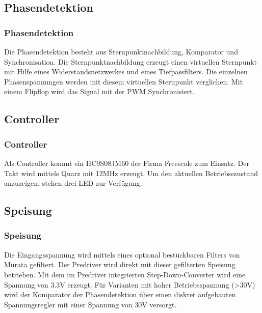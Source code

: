 \ifSTANDALONE
\subsection{Phasendetektion}
\fi
\ifEMBED
\subsubsection{Phasendetektion}
\fi
Die Phasendetektion besteht aus Sternpunktnachbildung, Komparator und 
Synchronisation. Die Sternpunktnachbildung erzeugt einen virtuellen Sternpunkt 
mit Hilfe eines Widerstandsnetzwerkes und eines Tiefpassfilters. Die einzelnen 
Phasenspannungen werden mit diesem virtuellen Sternpunkt verglichen. Mit einem 
Flipflop wird das Signal mit der PWM Synchronisiert. 

\ifSTANDALONE
\subsection{Controller}
\fi
\ifEMBED
\subsubsection{Controller}
\fi
Als Controller kommt ein HC9S08JM60 der Firma Freescale zum Einsatz. Der Takt 
wird mittels Quarz mit 12MHz erzeugt. Um den aktuellen Betriebsszustand 
anzuzeigen, stehen drei LED zur Verfügung. 

\ifSTANDALONE
\subsection{Speisung}
\fi
\ifEMBED
\subsubsection{Speisung}
\fi
Die Eingangsspannung wird mittels eines optional bestückbaren Filters von 
Murata gefiltert. Der Predriver wird direkt mit dieser gefilterten Speisung 
betrieben. Mit dem im Predriver integrierten Step-Down-Converter wird eine 
Spannung von 3.3V erzeugt. Für Varianten mit hoher Betriebsspannung (>30V) 
wird der Komparator der Phasendetektion über einen diskret aufgebauten 
Spannungsregler mit einer Spannung von 30V versorgt. 

